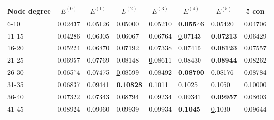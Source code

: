\begin{table*}[]
    \centering
    \begin{tabular}{|l|l|l|l|l|l|l||l|}
        \hline
        Node degree & \multicolumn{1}{c|}{$E^{(0)}$} & \multicolumn{1}{c|}{$E^{(1)}$} & \multicolumn{1}{c|}{$E^{(2)}$} & \multicolumn{1}{c|}{$E^{(3)}$} & \multicolumn{1}{c|}{$E^{(4)}$} & \multicolumn{1}{c||}{$E^{(5)}$} & \multicolumn{1}{c|}{5 con} \\ \hline
        6-10        & 0.02437                        & 0.05126                        & 0.05000                        & 0.05210                        & \textbf{0.05546}               & {\ul 0.05420}                   & 0.04706                    \\ \hline
        11-15       & 0.04286                        & 0.06305                        & 0.06067                        & 0.06764                        & {\ul 0.07143}                  & \textbf{0.07213}                & 0.06429                    \\ \hline
        16-20       & 0.05224                        & 0.06870                        & 0.07192                        & 0.07338                        & {\ul 0.07415}                  & \textbf{0.08123}                & 0.07557                    \\ \hline
        21-25       & 0.06957                        & 0.07769                        & 0.08148                        & {\ul 0.08611}                  & 0.08430                        & \textbf{0.08944}                & 0.08262                    \\ \hline
        26-30       & 0.06574                        & 0.07475                        & {\ul 0.08599}                  & 0.08492                        & \textbf{0.08790}               & 0.08176                         & 0.08784                    \\ \hline
        31-35       & 0.06837                        & 0.09441                        & \textbf{0.10828}               & 0.1011                         & 0.1025                         & {\ul 0.1050}                    & 0.10000                    \\ \hline
        36-40       & 0.07322                        & 0.07343                        & 0.08794                        & 0.09234                        & {\ul 0.09341}                  & \textbf{0.09957}                & 0.08603                    \\ \hline
        41-45       & 0.08924                        & 0.09060                        & 0.09939                        & 0.09934                        & \textbf{0.1045}                & {\ul 0.1030}                    & 0.09644                    \\ \hline

\end{tabular}
\end{table*}
